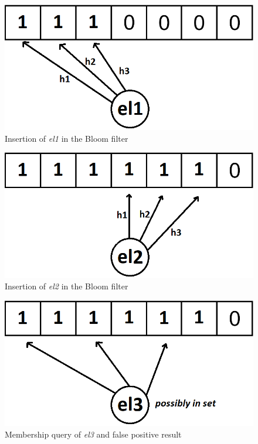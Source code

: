 \begin{figure}[!htb]
    \begin{center}
      \includegraphics[scale=0.4]{figures/fp-bloom-1.png}
      \caption[Bloom filter insertion]{Insertion of \textit{el1} in the Bloom filter}
      \label{fig:bloom-filter-fp1}
    \end{center}
\end{figure}

\begin{figure}[!htb]
    \begin{center}
      \includegraphics[scale=0.4]{figures/fp-bloom-2.png}
      \caption[Bloom filter insertion]{Insertion of \textit{el2} in the Bloom filter}
      \label{fig:bloom-filter-fp2}
    \end{center}
\end{figure}

\begin{figure}[!htb]
    \begin{center}
      \includegraphics[scale=0.4]{figures/fp-bloom-3.png}
      \caption[Bloom filter false positive]{Membership query of \textit{el3} and false positive result}
      \label{fig:bloom-filter-fp3}
    \end{center}
\end{figure}



